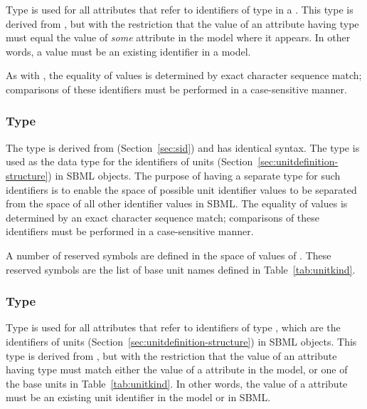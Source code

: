 Type  is used for all attributes that refer to
identifiers of type  in a \Model {}.  This type is
derived from , but with the restriction that the
value of an attribute having type  must equal the
value of \emph{some}  attribute in the model where
it appears.  In other words, a  value must be an
existing identifier in a model.

As with , the equality of  values
is determined by exact character sequence match; \ie comparisons
of these identifiers must be performed in a case-sensitive manner.


\subsubsection{Type }
\label{sec:unitsid}

The type  is derived from 
(Section~\ref{sec:sid}) and has identical syntax.  The
 type is used as the data type for the
identifiers of units (Section~\ref{sec:unitdefinition-structure})
in SBML objects.  The purpose of having a separate type for such
identifiers is to enable the space of possible unit identifier
values to be separated from the space of all other identifier
values in SBML.  The equality of  values is
determined by an exact character sequence match; \ie comparisons
of these identifiers must be performed in a case-sensitive manner.

A number of reserved symbols are defined in the space of values of
.  These reserved symbols are the list of base
unit names defined in Table~\vref{tab:unitkind}.


\subsubsection{Type }
\label{sec:unitsidref}

Type  is used for all attributes that refer
to identifiers of type , which are the
identifiers of units (Section~\ref{sec:unitdefinition-structure})
in SBML objects.  This type is derived from ,
but with the restriction that the value of an attribute having
type  must match either the value of a
 attribute in the model, or one of the
base units in Table~\ref{tab:unitkind}.  In other words,
the value of a  attribute must be an existing
unit identifier in the model or in SBML.

